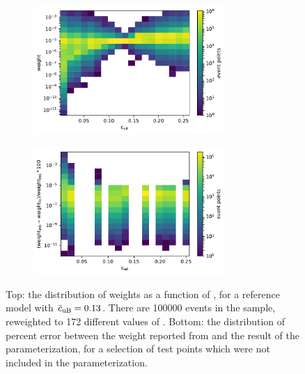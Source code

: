 \begin{figure}
  \begin{subfigure}{\linewidth}
  \includegraphics[width=0.8\textwidth]{figures/reweighting/cuB_vs_weight}
    \caption{}
    \label{sfig:cuB-vs-weight}
  \end{subfigure}
  \begin{subfigure}{\linewidth}
  \includegraphics[width=0.8\textwidth]{figures/reweighting/cuB_vs_err}
    \caption{}
    \label{sfig:cuB-vs-err}
  \end{subfigure}
  \caption[\madgraph event weights and quality of weight parameterization]{Top: the distribution of weights as a function of \cuB, for a reference model with $\bar{c}_{\text{uB}}=0.13$. There are \num{100000} events in the sample, reweighted to 172 different values of \cuB. Bottom: the distribution of percent error between the weight reported from \madgraph and the result of the parameterization, for a selection of test points which were not included in the parameterization.}
  \label{fig:1d-parameterized-reweighting}
\end{figure}

